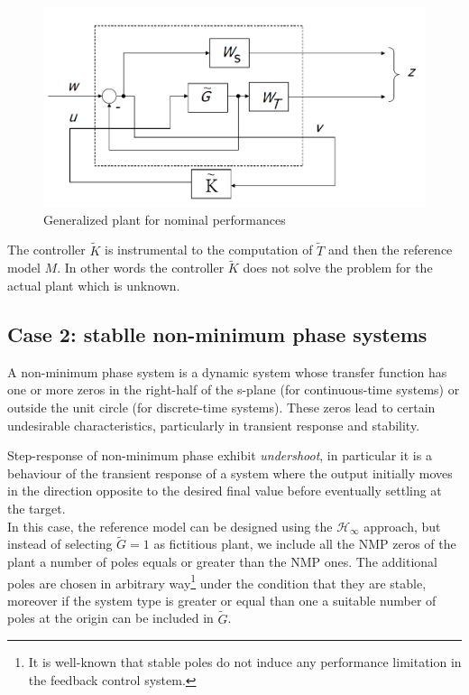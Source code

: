 \begin{figure}[h]
    \centering
    \includegraphics[scale=0.35]{img/gen_plant.png}
    \caption{Generalized plant for nominal performances}
    \label{fig:gen_plant}
\end{figure}
\begin{remark}
    The controller $\tilde{K}$ is instrumental to the computation of $\tilde{T}$ and then the reference model $M$. In other words the controller $\tilde{K}$ does not solve the problem for the actual plant which is unknown.
\end{remark}

\subsection{Case 2: stablle non-minimum phase systems}
\begin{definition}
    
A non-minimum phase system is a dynamic system whose transfer function has one or more zeros in the right-half of the s-plane (for continuous-time systems) or outside the unit circle (for discrete-time systems). These zeros lead to certain undesirable characteristics, particularly in transient response and stability.
\end{definition}

Step-response of non-minimum phase exhibit \textit{undershoot}, in particular it is a behaviour of  the transient response of a system where the output initially moves in the direction opposite to the desired final value before eventually settling at the target.\\

In this case, the reference model can be designed using the $\mathcal{H}_\infty$ approach, but instead of selecting $\tilde{G}=1$ as fictitious plant, we include all the NMP zeros of the plant a number of poles equals or greater than the NMP ones. The additional poles are chosen in arbitrary way\footnote{
    It is well-known that stable poles do not induce any performance limitation in the feedback control system.
} under the condition that they are stable, moreover if the system type is greater or equal than one a suitable number of poles at the origin can be included in $\tilde{G}$.

